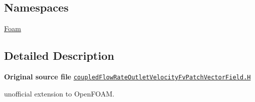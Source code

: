 \subsection*{Namespaces}
\begin{DoxyCompactItemize}
\item 
 \hyperlink{namespaceFoam}{Foam}
\end{DoxyCompactItemize}


\subsection{Detailed Description}
{\bfseries Original source file} \href{../../../home/carlo/data/GeN-Foam/GeN-Foam_ffn/GeN-Foam/GeN-Foam/FMU4FOAM/ECI4FOAM/src/externalComm/externalIO/input/BC/coupledFlowRateOutletVelocity/coupledFlowRateOutletVelocityFvPatchVectorField.H}{\tt coupled\+Flow\+Rate\+Outlet\+Velocity\+Fv\+Patch\+Vector\+Field.\+H}

\begin{DoxyVerb}unofficial extension to OpenFOAM.\end{DoxyVerb}
